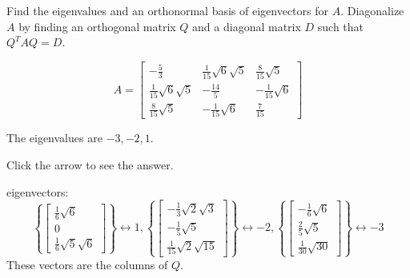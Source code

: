 \documentclass{ximera}
\begin{document}
 \begin{problem}\label{prb:9.6} Find the eigenvalues and an orthonormal basis of eigenvectors for $A.$
Diagonalize $A$ by finding an orthogonal matrix $Q$ and a diagonal matrix $D$
such that $Q^{T}AQ=D$.

\begin{equation*}
A=\left[
\begin{array}{ccc}
- \frac{5}{3} &  \frac{1}{15}\sqrt{6}\sqrt{5} &
 \frac{8}{15}\sqrt{5} \\
 \frac{1}{15}\sqrt{6}\sqrt{5} & - \frac{14}{5} &
- \frac{1}{15}\sqrt{6} \\
 \frac{8}{15}\sqrt{5} & - \frac{1}{15}\sqrt{6} &
 \frac{7}{15}
\end{array} \right]
\end{equation*}

\begin{hint} 
The eigenvalues are $-3,-2,1.$

Click the arrow to see the answer. \begin{expandable}
eigenvectors:
\[
\left\{ \left[
\begin{array}{c}
\frac{1}{6}\sqrt{6} \\
0 \\
\frac{1}{6}\sqrt{5}\sqrt{6}
\end{array}
\right] \right\} \leftrightarrow 1,\left\{ \left[
\begin{array}{c}
-\frac{1}{3}\sqrt{2}\sqrt{3} \\
-\frac{1}{5}\sqrt{5} \\
\frac{1}{15}\sqrt{2}\sqrt{15}
\end{array}
\right] \right\} \leftrightarrow -2,\left\{ \left[
\begin{array}{c}
-\frac{1}{6}\sqrt{6} \\
\frac{2}{5}\sqrt{5} \\
\frac{1}{30}\sqrt{30}
\end{array}
\right] \right\} \leftrightarrow -3
\]
These vectors are the columns of $Q$.
\end{expandable} \end{hint}
\end{problem}
\end{document}
